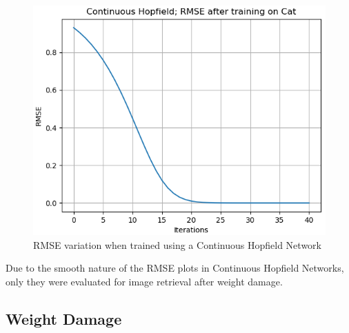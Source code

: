 \documentclass[12pt,a4paper]{article}
\newcommand{\noi}{\noindent}
\begin{document}
\begin{figure}[H]
\includegraphics[scale=0.45]{images/chn_0_cat.png}
\caption{RMSE variation when trained using a Continuous Hopfield Network}
\end{figure}

\noi
Due to the smooth nature of the RMSE plots in Continuous Hopfield Networks, only they were evaluated for image retrieval after weight damage.

\subsection{Weight Damage}
\end{document}
